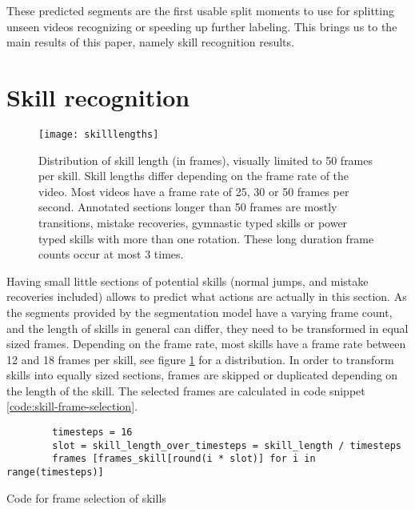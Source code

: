 These predicted segments are the first usable split moments to use for splitting unseen videos recognizing or speeding up further labeling.
This brings us to the main results of this paper, namely skill recognition results.


\section{Skill recognition}
\label{results:skill-recognition}

\begin{figure}
    \centering
    \texttt{[image: skilllengths]}
    \caption[frame counts of skill lengths]{Distribution of skill length (in frames), visually limited to 50 frames per skill. Skill lengths differ depending on the frame rate of the video. Most videos have a frame rate of 25, 30 or 50 frames per second. Annotated sections longer than 50 frames are mostly transitions, mistake recoveries, gymnastic typed skills or power typed skills with more than one rotation. These long duration frame counts occur at most 3 times.}
    \label{fig:skilllengths-counts}
\end{figure}


Having small little sections of potential skills (normal jumps, and mistake recoveries included) allows to predict what actions are actually in this section.
As the segments provided by the segmentation model have a varying frame count, and the length of skills in general can differ, they need to be transformed in equal sized frames.
Depending on the frame rate, most skills have a frame rate between 12 and 18 frames per skill, see figure \ref{fig:skilllengths-counts} for a distribution. In order to transform skills into equally sized sections, frames are skipped or duplicated depending on the length of the skill.
The selected frames are calculated in code snippet \ref{code:skill-frame-selection}.


\begin{listing}
    \begin{verbatim}
        timesteps = 16
        slot = skill_length_over_timesteps = skill_length / timesteps
        frames [frames_skill[round(i * slot)] for i in range(timesteps)]
    \end{verbatim}
    \caption[Code for frame selection skills]{Code for frame selection of skills}
    \label{code:skill-frame-selection}
\end{listing}



